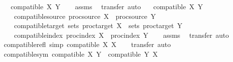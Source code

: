 \begin{isabellebody}
\ \ \ {\isachardoublequoteopen}compatible\ X\ Y{\isachardoublequoteclose}\isanewline
%
\isadelimproof
\ \ %
\endisadelimproof
%
\isatagproof
{}\isamarkupfalse%
\ assms\ \isamarkupfalse%
\ {\isacharparenleft}{\kern0pt}transfer{\isacharcomma}{\kern0pt}\ auto{\isacharparenright}{\kern0pt}%
\endisatagproof
{\isafoldproof}%
%
\isadelimproof
\isanewline
%
\endisadelimproof
\isanewline
{}\isamarkupfalse%
\isanewline
\ \ \ {\isachardoublequoteopen}compatible\ X\ Y{\isachardoublequoteclose}\isanewline
\ \ \isanewline
\ \ \ \ compatible{\isacharunderscore}{\kern0pt}source{\isacharcolon}{\kern0pt}\ {\isachardoublequoteopen}proc{\isacharunderscore}{\kern0pt}source\ X\ {\isacharequal}{\kern0pt}\ proc{\isacharunderscore}{\kern0pt}source\ Y{\isachardoublequoteclose}\ \isanewline
\ \ \ \ compatible{\isacharunderscore}{\kern0pt}target{\isacharcolon}{\kern0pt}\ {\isachardoublequoteopen}sets\ {\isacharparenleft}{\kern0pt}proc{\isacharunderscore}{\kern0pt}target\ X{\isacharparenright}{\kern0pt}\ {\isacharequal}{\kern0pt}\ sets\ {\isacharparenleft}{\kern0pt}proc{\isacharunderscore}{\kern0pt}target\ Y{\isacharparenright}{\kern0pt}{\isachardoublequoteclose}\ \isanewline
\ \ \ \ compatible{\isacharunderscore}{\kern0pt}index{\isacharcolon}{\kern0pt}\ {\isachardoublequoteopen}proc{\isacharunderscore}{\kern0pt}index\ X\ {\isacharequal}{\kern0pt}\ proc{\isacharunderscore}{\kern0pt}index\ Y{\isachardoublequoteclose}\isanewline
%
\isadelimproof
\ \ %
\endisadelimproof
%
\isatagproof
{}\isamarkupfalse%
\ assms\ \isamarkupfalse%
\ {\isacharparenleft}{\kern0pt}transfer{\isacharcomma}{\kern0pt}\ auto{\isacharparenright}{\kern0pt}{\isacharplus}{\kern0pt}%
\endisatagproof
{\isafoldproof}%
%
\isadelimproof
\isanewline
%
\endisadelimproof
\isanewline
{}\isamarkupfalse%
\ compatible{\isacharunderscore}{\kern0pt}refl\ {\isacharbrackleft}{\kern0pt}simp{\isacharbrackright}{\kern0pt}{\isacharcolon}{\kern0pt}\ {\isachardoublequoteopen}compatible\ X\ X{\isachardoublequoteclose}\isanewline
%
\isadelimproof
\ \ %
\endisadelimproof
%
\isatagproof
{}\isamarkupfalse%
\ {\isacharparenleft}{\kern0pt}transfer{\isacharcomma}{\kern0pt}\ auto{\isacharparenright}{\kern0pt}%
\endisatagproof
{\isafoldproof}%
%
\isadelimproof
\isanewline
%
\endisadelimproof
\isanewline
{}\isamarkupfalse%
\ compatible{\isacharunderscore}{\kern0pt}sym{\isacharcolon}{\kern0pt}\ {\isachardoublequoteopen}compatible\ X\ Y\ {\isasymLongrightarrow}\ compatible\ Y\ X{\isachardoublequoteclose}\isanewline

\end{isabellebody}
